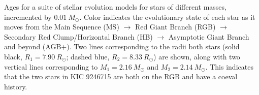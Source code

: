 \label{fig:mesa} Ages for a suite of stellar evolution models for stars of different masses, incremented by $0.01 \ M_\odot$. Color indicates the evolutionary state of each star as it moves from the Main Sequence (MS) $\rightarrow$ Red Giant Branch (RGB) $\rightarrow$ Secondary Red Clump/Horizontal Branch (HB) $\rightarrow$ Asymptotic Giant Branch and beyond (AGB+). Two lines corresponding to the radii both stars (solid black, $R_1 = 7.90 \ R_\odot$; dashed blue, $R_2 = 8.33 \ R_\odot$) are shown, along with two vertical lines corresponding to $M_1 = 2.16 \ M_\odot$ and $M_2 = 2.14 \ M_\odot$. This indicates that the two stars in KIC 9246715 are both on the RGB and have a coeval history.
